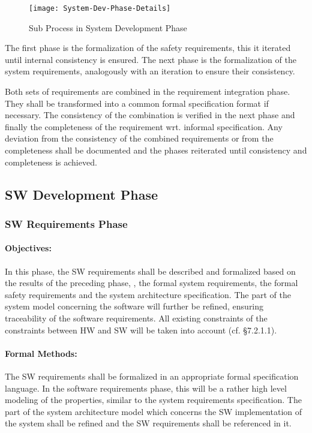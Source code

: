 \begin{figure}[ht]
  \centering
  \texttt{[image: System-Dev-Phase-Details]}
  \caption{Sub Process in System Development Phase}
  \label{fig:detailed-sys-dev-phase}
\end{figure}

The first phase is the formalization of the safety requirements, this it
iterated until internal consistency is ensured. The next phase is the
formalization of the system requirements, analogously with an iteration to
ensure their consistency.

Both sets of requirements are combined in the requirement integration
phase. They shall be transformed into a common formal specification format if
necessary. The consistency of the combination is verified in the next phase and
finally the completeness of the requirement wrt. informal specification. Any
deviation from the consistency of the combined requirements or from the
completeness shall be documented and the phases reiterated until consistency and
completeness is achieved.


\subsection{SW Development Phase}
\label{sec:sw-development-phase}

\subsubsection{SW Requirements Phase}
\label{sec:sw-requ-phase}

\paragraph{Objectives:}
\label{sec:sw-req-objective}
In this phase, the SW requirements shall be described and formalized based on
the results of the preceding phase, \ie, the formal system requirements, the
formal safety requirements and the system architecture specification. The part
of the system model concerning the software will further be refined, ensuring
traceability of the software requirements. All existing constraints of the
constraints between HW and SW will be taken into account (cf. §7.2.1.1).

\paragraph{Formal Methods:}
\label{sec:sw-req-formal-methods}
The SW requirements shall be formalized in an appropriate formal specification
language. In the software requirements phase, this will be a rather high level
modeling of the properties, similar to the system requirements
specification. The part of the system architecture model which concerns the SW
implementation of the system shall be refined and the SW requirements shall be
referenced in it.

